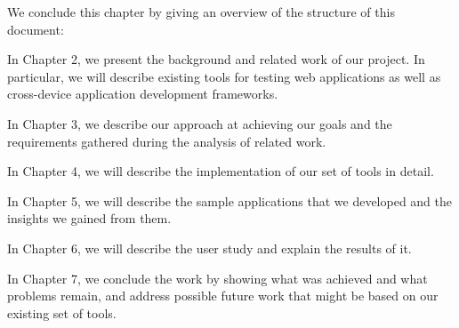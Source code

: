 We conclude this chapter by giving an overview of the structure of this document:

In Chapter 2, we present the background  and related work of our project. In particular, we will describe existing tools for testing web applications as well as cross-device application development frameworks.

In Chapter 3, we describe our approach at achieving our goals and the requirements gathered during the analysis of related work.

In Chapter 4, we will describe the implementation of our set of tools in detail.

In Chapter 5, we will describe the sample applications that we developed and the insights we gained from them.

In Chapter 6, we will describe the user study and explain the results of it.

In Chapter 7, we conclude the work by showing what was achieved and what problems remain, and address possible future work that might be based on our existing set of tools.